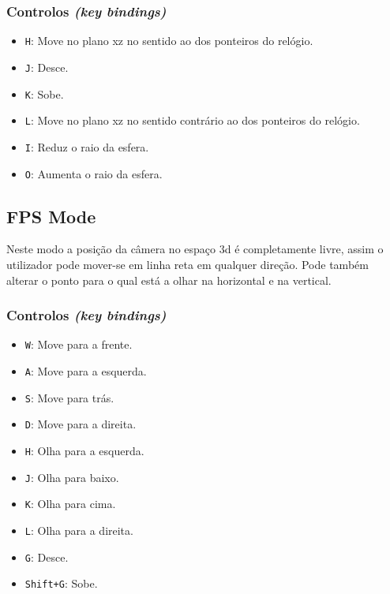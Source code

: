 \documentclass[a4paper]{article}
\begin{document}
\subsubsection{Controlos \textit{(key bindings)}}

\begin{itemize}
    \item \texttt{H}: Move no plano xz no sentido ao dos ponteiros do relógio.
    \item \texttt{J}: Desce.
    \item \texttt{K}: Sobe.
    \item \texttt{L}: Move no plano xz no sentido contrário ao dos ponteiros do relógio.
    \item \texttt{I}: Reduz o raio da esfera.
    \item \texttt{O}: Aumenta o raio da esfera.
\end{itemize}

\subsection{FPS Mode}

Neste modo a posição da câmera no espaço 3d é completamente livre, assim o utilizador pode mover-se em linha reta em qualquer direção. Pode também alterar o ponto para o qual está a olhar na horizontal e na vertical.

\subsubsection{Controlos \textit{(key bindings)}}

\begin{itemize}
    \item \texttt{W}: Move para a frente.
    \item \texttt{A}: Move para a esquerda.
    \item \texttt{S}: Move para trás.
    \item \texttt{D}: Move para a direita.
    \item \texttt{H}: Olha para a esquerda.
    \item \texttt{J}: Olha para baixo.
    \item \texttt{K}: Olha para cima.
    \item \texttt{L}: Olha para a direita.
    \item \texttt{G}: Desce.
    \item \texttt{Shift+G}: Sobe.
\end{itemize}
\end{document}
